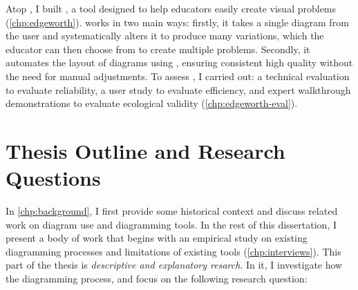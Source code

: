 Atop \Penrose, I built \Edgeworth, a tool designed to help educators easily create visual problems (\cref{chp:edgeworth}). \Edgeworth works in two main ways: firstly, it takes a single diagram from the user and systematically alters it to produce many variations, which the educator can then choose from to create multiple problems. Secondly, it automates the layout of diagrams using \Penrose, ensuring consistent high quality without the need for manual adjustments. To assess \Edgeworth, I carried out: a technical evaluation to evaluate reliability, a user study to evaluate efficiency, and expert walkthrough demonstrations to evaluate ecological validity (\cref{chp:edgeworth-eval}). 






\section{Thesis Outline and Research Questions}


In \cref{chp:background}, I first provide some historical context and discuss related work on diagram use and diagramming tools. In the rest of this dissertation, I present a body of work that begins with an empirical study on existing diagramming processes and limitations of existing tools (\cref{chp:interviews}). This part of the thesis is \textit{descriptive and explanatory resarch}.  In it, I investigate how the diagramming process, and focus on the following research question:

